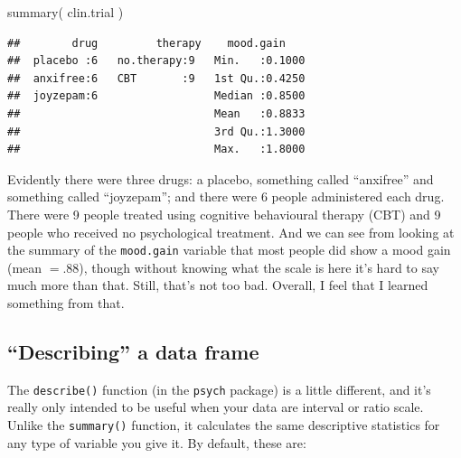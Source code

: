 \documentclass[
]{book}
\newenvironment{Shaded}{\begin{snugshade}}{\end{snugshade}}
\newcommand{\FunctionTok}[1]{\textcolor[rgb]{0.00,0.00,0.00}{#1}}
\newcommand{\NormalTok}[1]{#1}
\begin{document}
\begin{Shaded}
\begin{Highlighting}[]
\FunctionTok{summary}\NormalTok{( clin.trial )}
\end{Highlighting}
\end{Shaded}

\begin{verbatim}
##        drug         therapy    mood.gain     
##  placebo :6   no.therapy:9   Min.   :0.1000  
##  anxifree:6   CBT       :9   1st Qu.:0.4250  
##  joyzepam:6                  Median :0.8500  
##                              Mean   :0.8833  
##                              3rd Qu.:1.3000  
##                              Max.   :1.8000
\end{verbatim}

Evidently there were three drugs: a placebo, something called ``anxifree'' and something called ``joyzepam''; and there were 6 people administered each drug. There were 9 people treated using cognitive behavioural therapy (CBT) and 9 people who received no psychological treatment. And we can see from looking at the summary of the \texttt{mood.gain} variable that most people did show a mood gain (mean \(=.88\)), though without knowing what the scale is here it's hard to say much more than that. Still, that's not too bad. Overall, I feel that I learned something from that.

\hypertarget{describing-a-data-frame}{%
\subsection{``Describing'' a data frame}\label{describing-a-data-frame}}

The \texttt{describe()} function (in the \texttt{psych} package) is a little different, and it's really only intended to be useful when your data are interval or ratio scale. Unlike the \texttt{summary()} function, it calculates the same descriptive statistics for any type of variable you give it. By default, these are:
\end{document}
